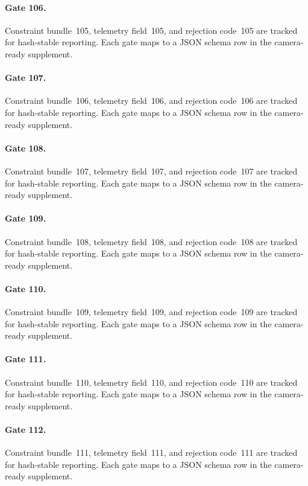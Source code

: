 \documentclass[sigconf,nonacm]{acmart}
\begin{document}
\paragraph{Gate 106.}
Constraint bundle~105, telemetry field~105, and rejection code~105 are tracked for hash-stable reporting. Each gate maps to a JSON schema row in the camera-ready supplement. %

\paragraph{Gate 107.}
Constraint bundle~106, telemetry field~106, and rejection code~106 are tracked for hash-stable reporting. Each gate maps to a JSON schema row in the camera-ready supplement. %

\paragraph{Gate 108.}
Constraint bundle~107, telemetry field~107, and rejection code~107 are tracked for hash-stable reporting. Each gate maps to a JSON schema row in the camera-ready supplement. %

\paragraph{Gate 109.}
Constraint bundle~108, telemetry field~108, and rejection code~108 are tracked for hash-stable reporting. Each gate maps to a JSON schema row in the camera-ready supplement. %

\paragraph{Gate 110.}
Constraint bundle~109, telemetry field~109, and rejection code~109 are tracked for hash-stable reporting. Each gate maps to a JSON schema row in the camera-ready supplement. %

\paragraph{Gate 111.}
Constraint bundle~110, telemetry field~110, and rejection code~110 are tracked for hash-stable reporting. Each gate maps to a JSON schema row in the camera-ready supplement. %

\paragraph{Gate 112.}
Constraint bundle~111, telemetry field~111, and rejection code~111 are tracked for hash-stable reporting. Each gate maps to a JSON schema row in the camera-ready supplement. %
\end{document}
